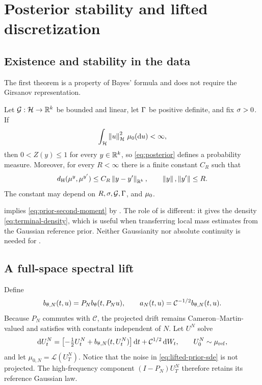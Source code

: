 \section{Posterior stability and lifted discretization}
\label{sec:wellposed}

\subsection{Existence and stability in the data}

The first theorem is a property of Bayes' formula and does not require
the Girsanov representation.

\begin{theorem}
\label{thm:wellposed}
Let $\mathcal{G}:\mathcal{H}\to\mathbb{R}^k$ be bounded and linear, let $\Gamma$ be positive
definite, and fix $\sigma>0$.  If
\begin{equation}
  \int_{\mathcal{H}}\left\lVert u\right\rVert_{\mathcal{H}}^2\,{\mu_{0}}(\mathrm du)<\infty ,
  \label{eq:prior-second-moment}
\end{equation}
then $0<Z(y)\leq1$ for every $y\in\mathbb{R}^k$, so
\eqref{eq:posterior} defines a probability measure.  Moreover, for
every $R<\infty$ there is a finite constant $C_R$ such that
\begin{equation}
  {d_{\mathrm{H}}}(\mu^y,\mu^{y'})
  \leq C_R\left\lVert y-y'\right\rVert_{\mathbb{R}^k},
  \qquad \left\lVert y\right\rVert,\left\lVert y'\right\rVert\leq R .
  \label{eq:data-stability}
\end{equation}
The constant may depend on
$R,\sigma,\mathcal{G},\Gamma$, and ${\mu_{0}}$.
\end{theorem}

 implies \eqref{eq:prior-second-moment} by
.  The role of  is different:
it gives the density \eqref{eq:terminal-density}, which is useful when
transferring local mass estimates from the Gaussian reference prior.
Neither Gaussianity nor absolute continuity is needed for
.

\subsection{A full-space spectral lift}

Define
\begin{equation}
  {b_{\theta,N}}(t,u)=P_N{b_{\theta}}(t,P_Nu),\qquad
  a_N(t,u)=\mathcal C^{-1/2}{b_{\theta,N}}(t,u).
  \label{eq:projected-drift}
\end{equation}
Because $P_N$ commutes with $\mathcal C$, the projected drift remains
Cameron--Martin-valued and satisfies
 with constants independent of $N$.  Let $U^N$ solve
\begin{equation}
  \mathrm dU_t^N
  =\bigl[-\tfrac12U_t^N+{b_{\theta,N}}(t,U_t^N)\bigr]\,\mathrm dt
   +\mathcal C^{1/2}\,\mathrm dW_t,\qquad
  U_0^N\sim\mu_{\mathrm{ref}},
  \label{eq:lifted-prior-sde}
\end{equation}
and let $\mu_{0,N}=\mathcal L(U_T^N)$.  Notice that the noise in
\eqref{eq:lifted-prior-sde} is not projected.  The high-frequency
component $(I-P_N)U_T^N$ therefore retains its reference Gaussian law.

